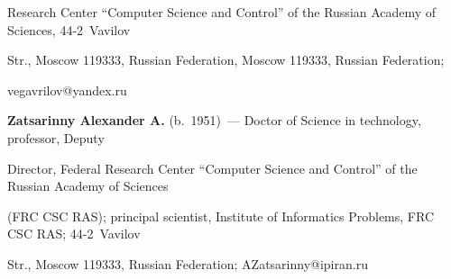 Research Center ``Computer Science and Control'' of the Russian Academy of Sciences, 44-2~Vavilov 


Str., Moscow 119333, Russian Federation, Moscow 119333, Russian Federation; 


\mbox{vegavrilov@yandex.ru}





\vspace*{3pt}





\noindent


\textbf{Zatsarinny Alexander A.} (b.\ 1951)~--- Doctor of Science in technology, professor, Deputy 


Director, Federal Research Center ``Computer Science and Control'' of the Russian Academy of Sciences 


(FRC CSC RAS); principal scientist, Institute of Informatics Problems, FRC CSC RAS; 44-2~Vavilov 


Str., Moscow 119333, Russian Federation; \mbox{AZatsarinny@ipiran.ru}








\label{end\stat}





\renewcommand{\bibname}{\protect\rm Литература} 


